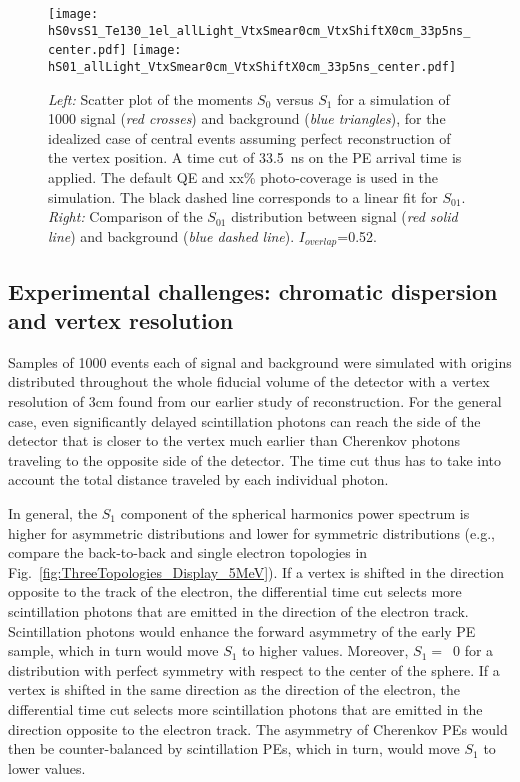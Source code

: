 

\begin{figure*}[h]
  \centering
  \texttt{[image: hS0vsS1\_Te130\_1el\_allLight\_VtxSmear0cm\_VtxShiftX0cm\_33p5ns\_center.pdf]}
  \texttt{[image: hS01\_allLight\_VtxSmear0cm\_VtxShiftX0cm\_33p5ns\_center.pdf]}
  \caption{\emph{Left:} Scatter plot of the moments $S_0$ versus $S_1$
    for a simulation of 1000 signal (\emph{red crosses}) and
    background (\emph{blue triangles}), for the idealized case of
    central events assuming perfect reconstruction of the vertex
    position. A time cut of 33.5~ns on the PE arrival time is
    applied. The default QE and xx\% photo-coverage is used in the
    simulation.  The black dashed line corresponds to a linear fit for
    $S_{01}$.  \emph{Right:} Comparison of the $S_{01}$ distribution
    between signal (\emph{red solid line}) and background (\emph{blue
    dashed line}).  $I_{overlap}$=0.52.}
\label{fig:SL_Te_33p5ns_center}
\end{figure*}


\subsection{Experimental challenges: chromatic dispersion and 
vertex resolution}

Samples of 1000 events each of signal and background were simulated
with origins distributed throughout the whole fiducial volume of the
detector with a vertex resolution of 3cm found from our earlier study of
reconstruction\cite{Aberle2014}.  For the general case, even
significantly delayed scintillation photons can reach the side of the
detector that is closer to the vertex much earlier than Cherenkov
photons traveling to the opposite side of the detector. The time cut
thus has to take into account the total distance traveled by each
individual photon.

In general, the $S_1$ component of the spherical harmonics power
spectrum is higher for asymmetric distributions and lower for
symmetric distributions (e.g., compare the back-to-back and single
electron topologies in
Fig.~\ref{fig:ThreeTopologies_Display_5MeV}). If a vertex is shifted
in the direction opposite to the track of the electron, the
differential time cut selects more scintillation photons that are
emitted in the direction of the electron track.  Scintillation photons
would enhance the forward asymmetry of the early PE sample, which
in turn would move $S_1$ to higher values.  Moreover, $S_1=$~0 for a
distribution with perfect symmetry with respect to the center of the
sphere.  If a vertex is shifted in the same direction as the direction
of the electron, the differential time cut selects more scintillation
photons that are emitted in the direction opposite to the electron
track. The asymmetry of Cherenkov PEs would then be counter-balanced
by scintillation PEs, which in turn, would move $S_1$ to lower values.


